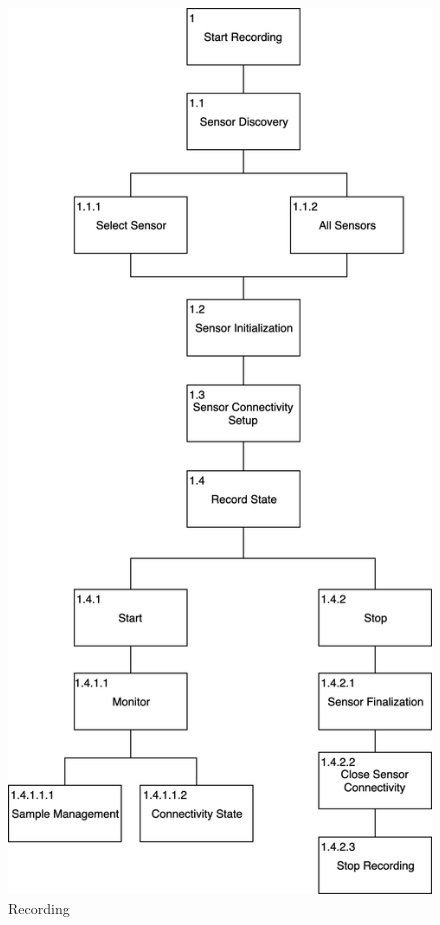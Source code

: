 \begin{figure}
    \centering
    \includegraphics[scale=0.2]{images/Recording.png}
    \caption{Recording}
    \label{fig:hta_recording}
\end{figure}

